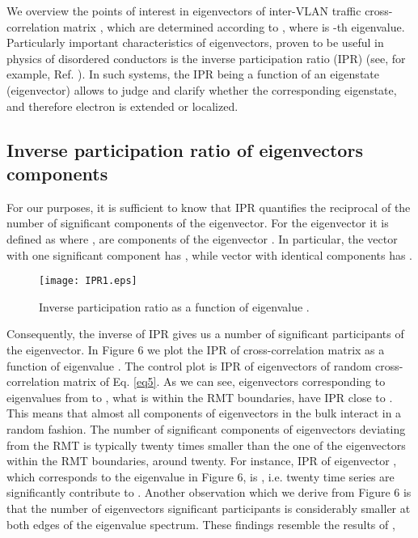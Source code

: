 \documentclass{IEEEtran}
\begin{document}
We overview the points of interest in eigenvectors of inter-VLAN traffic
cross-correlation matrix , which are determined according to ,
where  is -th eigenvalue. Particularly important
characteristics of eigenvectors, proven to be useful in physics of
disordered conductors is the inverse participation ratio (IPR) (see,
for example, Ref. \cite{Guhr3}). In such systems, the IPR being a
function of an eigenstate (eigenvector) allows to judge and clarify
whether the corresponding eigenstate, and therefore electron is extended
or localized. 


\subsection{Inverse participation ratio of eigenvectors components}

For our purposes, it is sufficient to know that IPR quantifies the
reciprocal of the number of significant components of the eigenvector.
For the eigenvector  it is defined as
where ,  are components of the eigenvector
. In particular, the vector with one significant component
has , while vector with identical components 
has .\begin{figure}[h]
\begin{center}\texttt{[image: IPR1.eps]}\end{center}


\caption{\label{6} Inverse participation ratio as a function of eigenvalue
.}
\end{figure}
Consequently, the inverse of IPR gives us a number of significant
participants of the eigenvector. In Figure 6 we plot the IPR of cross-correlation
matrix  as a function of eigenvalue . The control plot
is IPR of eigenvectors of random cross-correlation matrix  of
Eq. \ref{eq5}. As we can see, eigenvectors corresponding to eigenvalues
from  to , what is within the RMT boundaries, have IPR
close to . This means that almost all components of eigenvectors
in the bulk interact in a random fashion. The number of significant
components of eigenvectors deviating from the RMT is typically twenty
times smaller than the one of the eigenvectors within the RMT boundaries,
around twenty. For instance, IPR of eigenvector , which
corresponds to the eigenvalue  in Figure 6, is , i.e.
twenty time series are significantly contribute to . Another
observation which we derive from Figure 6 is that the number of eigenvectors
significant participants is considerably smaller at both edges of
the eigenvalue spectrum. These findings resemble the results of \cite{Guhr1},
\end{document}
